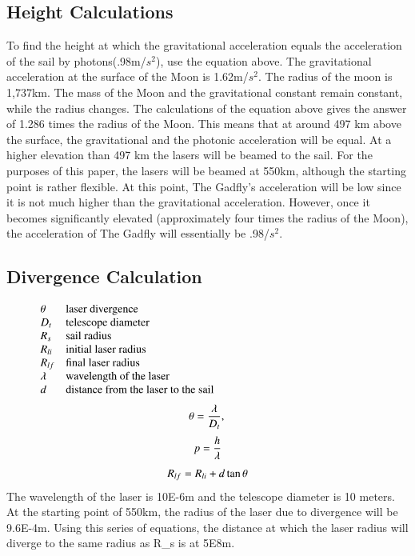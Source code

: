 \documentclass{aa}
\begin{document}
\subsection{Height Calculations}
To find the height at which the gravitational acceleration equals the acceleration of the sail by photons(.98m/$s^2$), use the equation above. The gravitational acceleration at the surface of the Moon is 1.62m/$s^2$. The radius of the moon is 1,737km. The mass of the Moon and the gravitational constant remain constant, while the radius changes. The calculations of the equation above gives the answer of 1.286 times the radius of the Moon. This means that at around 497 km above the surface, the gravitational and the photonic acceleration will be equal. At a higher elevation than 497 km the lasers will be beamed to the sail. For the purposes of this paper, the lasers will be beamed at 550km, although the starting point is rather flexible. At this point, The Gadfly's acceleration will be low since it is not much higher than the gravitational acceleration. However, once it becomes significantly elevated (approximately four times the radius of the Moon), the acceleration of The Gadfly will essentially be .98/$s^2$.
\subsection{Divergence Calculation}
\[ 
      \begin{array}{lp{0.8\linewidth}}
         \theta  & laser divergence     \\
         D_{t}   & telescope diameter                   \\
         R_{s}   & sail radius			\\
         R_{li}  & initial laser radius \\
         R_{lf}  & final laser radius \\
         \lambda & wavelength of the laser \\
         d       & distance from the laser to the sail \\
         
         \end{array}
\]
 \begin{equation}
      \theta = \frac{\lambda}{D_{t}},  \\
 \end{equation}
 \begin{equation}
 	  p = \frac{h}{\lambda}   \\
 \end{equation}
  \begin{equation}
 	  R_{lf} = R_{li} + d\tan{\theta} \\
 \end{equation}
The wavelength of the laser is 10E-6m and the telescope diameter is 10 meters. At the starting point of 550km, the radius of the laser due to divergence will be 9.6E-4m. Using this series of equations, the distance at which the laser radius will diverge to the same radius as R_{s} is at 5E8m.
\end{document}
